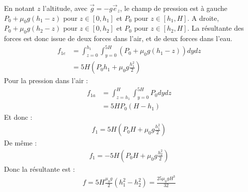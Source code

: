 \documentclass{report}
\begin{document}
En notant $z$ l'altitude, avec $\vec{g}=-g\vec{e}_z$, le champ de pression est à gauche $P_0+\mu_0g(h_1-z)$ pour $z\in[0,h_1]$ et $P_0$ pour $z\in[h_1, H]$. A droite, $P_0+\mu_0g(h_2-z)$ pour $z\in[0,h_2]$ et $P_0$ pour $z\in[h_2, H]$. La résultante des forces est donc issue de deux forces dans l'air, et de deux forces dans l'eau.
\begin{align*}
	f_{1e}&=\int_{z=0}^{h_1}\int_{y=0}^{5H}(P_0+\mu_0g(h_1-z))dydz \\
	&=5H\left(P_0h_1+\mu_0g\frac{h_1^2}{2} \right) 
\end{align*}
Pour la pression dans l'air :
\begin{align*}
	f_{1a}&=\int_{z=h_1}^{H}\int_{y=0}^{5H}P_0dydz \\
	&=5HP_0(H-h_1)
\end{align*}
Et donc :
\begin{align*}
	f_1=5H\left(P_0H+\mu_0g\frac{h_1^2}{2} \right) 
\end{align*}
De même : 
\begin{align*}
	f_1=-5H\left(P_0H+\mu_0g\frac{h_2^2}{2} \right) 
\end{align*}
Donc la résultante est :
\begin{align*}
	f=5H\frac{\mu_0 g}{2}(h_1^2-h_2^2)=\frac{25\mu_0gH^3}{32}
\end{align*}

\newpage
\end{document}
